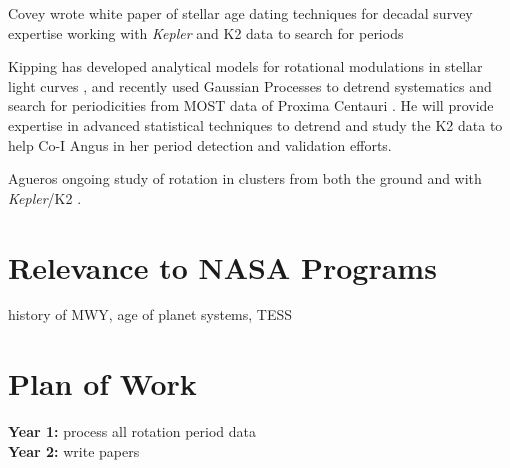 \documentclass[12pt]{article}
\newcommand{\Kepler}{\textsl{Kepler}\xspace}
\begin{document}
Covey
wrote white paper of stellar age dating techniques  for decadal survey \citep{covey2010white}
expertise working with \Kepler and K2 data to search for periods \citep{douglas2016,covey2016}

Kipping
has developed analytical models for rotational modulations in stellar light curves \citep{kipping2012}, and recently used Gaussian Processes to detrend systematics and search for periodicities from MOST data of Proxima Centauri \citep{kippingmost}. He will provide expertise in advanced statistical techniques to detrend and study the K2 data to help Co-I Angus in her period detection and validation efforts.

Agueros
ongoing study of rotation in clusters from both the ground \citep{agueros2011} and with \Kepler/K2 \citet{douglas2016,douglas2017,nunez2017}.

\section{Relevance to NASA Programs}
history of MWY, age of planet systems, TESS



\section{Plan of Work}
{\bf Year 1:} process all rotation period data
\\
{\bf Year 2:} write papers



\clearpage


\end{document}
